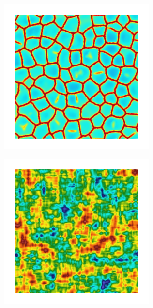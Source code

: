 \begin{figure}[!htb]
\begin{subfigure}[b]{0.15\textwidth}
    \end{subfigure}
    \begin{subfigure}[b]{0.15\textwidth}
        \includegraphics[width=\textwidth]{past/figures/d_sqexp_cartesian_5_5_rho_0_seed_a.png}
    \end{subfigure}
    \begin{subfigure}[b]{0.15\textwidth}
        \includegraphics[width=\textwidth]{past/figures/Gc_exp_cartesian_5_5_rho_0_seed_b.png}

\end{subfigure}
\end{figure}
